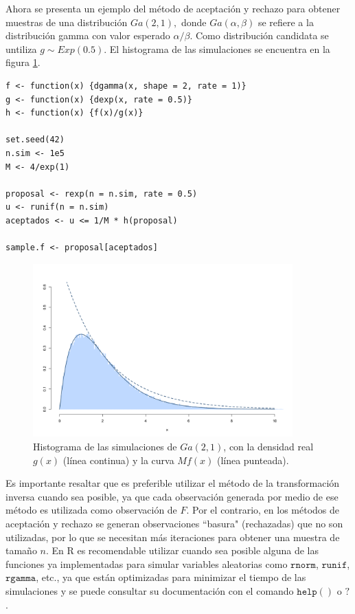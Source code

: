 \documentclass[11pt,a4paper]{article}
\begin{document}
Ahora se presenta un ejemplo del método de aceptación y rechazo para obtener muestras de una distribución $Ga(2, 1),$ donde $Ga(\alpha, \beta)$ se refiere a la distribución gamma con valor esperado $\alpha / \beta$. Como distribución candidata se untiliza $g \sim Exp(0.5).$ El histograma de las simulaciones se encuentra en la figura \ref{fig:acep_rech}.\\

\begin{lstlisting}
f <- function(x) {dgamma(x, shape = 2, rate = 1)}
g <- function(x) {dexp(x, rate = 0.5)}
h <- function(x) {f(x)/g(x)}

set.seed(42)
n.sim <- 1e5
M <- 4/exp(1)

proposal <- rexp(n = n.sim, rate = 0.5)
u <- runif(n = n.sim)
aceptados <- u <= 1/M * h(proposal)

sample.f <- proposal[aceptados]
\end{lstlisting} \leavevmode\newline

\begin{figure}[h]
\centering\includegraphics[width=10cm]{aceptacion_rechazo.png}
\caption{Histograma de las simulaciones de $Ga(2, 1)$, con la densidad real $g(x)$ (línea continua) y la curva $M f(x)$ (línea punteada).}
\label{fig:acep_rech}
\end{figure}

Es importante resaltar que es preferible utilizar el método de la transformación inversa cuando sea posible, ya que cada observación generada por medio de ese método es utilizada como observación de $F$. Por el contrario, en los métodos de aceptación y rechazo se generan observaciones ``basura" (rechazadas) que no son utilizadas, por lo que se necesitan más iteraciones para obtener una muestra de tamaño $n$. En R es recomendable utilizar cuando sea posible alguna de las funciones ya implementadas para simular variables aleatorias como $\mathtt{rnorm}$, $\mathtt{runif}$, $\mathtt{rgamma}$, etc., ya que están optimizadas para minimizar el tiempo de las simulaciones y se puede consultar su documentación con el comando $\mathtt{help()}$ o $\mathtt{?}$.\\
\end{document}
